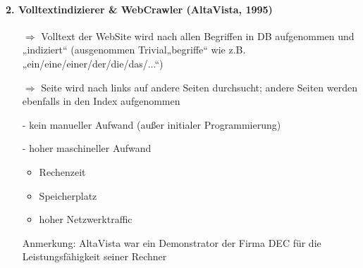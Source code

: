 \paragraph{2. Volltextindizierer \& WebCrawler (AltaVista, 1995)}\hspace*{1mm}
\begin{itemize}
\item[$\Rightarrow$] Volltext der WebSite wird nach allen Begriffen in DB aufgenommen und „indiziert“ (ausgenommen Trivial„begriffe“ wie z.B. „ein/eine/einer/der/die/das/...“)
\item[$\Rightarrow$] Seite wird nach links auf andere Seiten durchsucht; andere Seiten werden ebenfalls in den Index aufgenommen
\item[-] kein manueller Aufwand (außer initialer Programmierung)
\item[-] hoher maschineller Aufwand
  \begin{itemize}
  \item Rechenzeit
  \item Speicherplatz
  \item hoher Netzwerktraffic
  \end{itemize}
\item[Anmerkung:] AltaVista war ein Demonstrator der Firma DEC für die Leistungsfähigkeit seiner Rechner
\end{itemize}